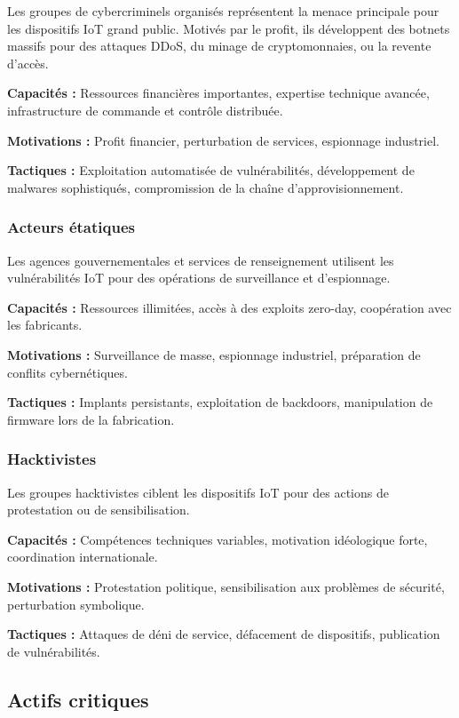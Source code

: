 Les groupes de cybercriminels organisés représentent la menace principale pour les dispositifs IoT grand public. Motivés par le profit, ils développent des botnets massifs pour des attaques DDoS, du minage de cryptomonnaies, ou la revente d'accès.

\textbf{Capacités :} Ressources financières importantes, expertise technique avancée, infrastructure de commande et contrôle distribuée.

\textbf{Motivations :} Profit financier, perturbation de services, espionnage industriel.

\textbf{Tactiques :} Exploitation automatisée de vulnérabilités, développement de malwares sophistiqués, compromission de la chaîne d'approvisionnement.

\subsubsection{Acteurs étatiques}

Les agences gouvernementales et services de renseignement utilisent les vulnérabilités IoT pour des opérations de surveillance et d'espionnage.

\textbf{Capacités :} Ressources illimitées, accès à des exploits zero-day, coopération avec les fabricants.

\textbf{Motivations :} Surveillance de masse, espionnage industriel, préparation de conflits cybernétiques.

\textbf{Tactiques :} Implants persistants, exploitation de backdoors, manipulation de firmware lors de la fabrication.

\subsubsection{Hacktivistes}

Les groupes hacktivistes ciblent les dispositifs IoT pour des actions de protestation ou de sensibilisation.

\textbf{Capacités :} Compétences techniques variables, motivation idéologique forte, coordination internationale.

\textbf{Motivations :} Protestation politique, sensibilisation aux problèmes de sécurité, perturbation symbolique.

\textbf{Tactiques :} Attaques de déni de service, défacement de dispositifs, publication de vulnérabilités.

\subsection{Actifs critiques}

